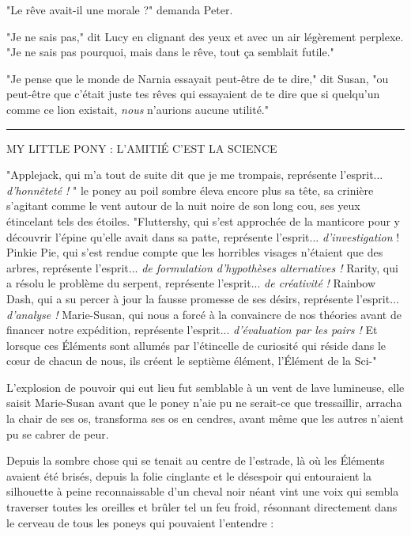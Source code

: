 "Le rêve avait-il une morale ?" demanda Peter.

"Je ne sais pas," dit Lucy en clignant des yeux et avec un air légèrement perplexe. "Je ne sais pas pourquoi, mais dans le rêve, tout ça semblait futile."

"Je pense que le monde de Narnia essayait peut-être de te dire," dit Susan, "ou peut-être que c'était juste tes rêves qui essayaient de te dire que si quelqu'un comme ce lion existait, \emph{nous } n'aurions aucune utilité."
\par\noindent\rule{\textwidth}{0.4pt}

\begin{center}MY LITTLE PONY : L'AMITIÉ C'EST LA SCIENCE\end{center}


"Applejack, qui m'a tout de suite dit que je me trompais, représente l'esprit... \emph{d'honnêteté !} " le poney au poil sombre éleva encore plus sa tête, sa crinière s'agitant comme le vent autour de la nuit noire de son long cou, ses yeux étincelant tels des étoiles. "Fluttershy, qui s'est approchée de la manticore pour y découvrir l'épine qu'elle avait dans sa patte, représente l'esprit... \emph{d'investigation}  ! Pinkie Pie, qui s'est rendue compte que les horribles visages n'étaient que des arbres, représente l'esprit... \emph{de formulation d'hypothèses alternatives !}  Rarity, qui a résolu le problème du serpent, représente l'esprit... \emph{de créativité}  \emph{!}  Rainbow Dash, qui a su percer à jour la fausse promesse de ses désirs, représente l'esprit... \emph{d'analyse !}  Marie-Susan, qui nous a forcé à la convaincre de nos théories avant de financer notre expédition, représente l'esprit... \emph{d'évaluation par les pairs !}  Et lorsque ces Éléments sont allumés par l'étincelle de curiosité qui réside dans le cœur de chacun de nous, ils créent le septième élément, l'Élément de la Sci-"

L'explosion de pouvoir qui eut lieu fut semblable à un vent de lave lumineuse, elle saisit Marie-Susan avant que le poney n'aie pu ne serait-ce que tressaillir, arracha la chair de ses os, transforma ses os en cendres, avant même que les autres n'aient pu se cabrer de peur.

Depuis la sombre chose qui se tenait au centre de l'estrade, là où les Éléments avaient été brisés, depuis la folie cinglante et le désespoir qui entouraient la silhouette à peine reconnaissable d'un cheval noir néant vint une voix qui sembla traverser toutes les oreilles et brûler tel un feu froid, résonnant directement dans le cerveau de tous les poneys qui pouvaient l'entendre :

